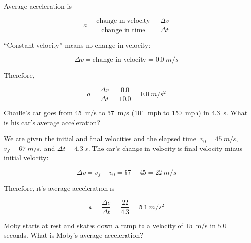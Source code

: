 \documentclass{article}
\numberwithin{equation}{section}
\numberwithin{figure}{section}
\begin{document}
\Solution Average acceleration is

\begin{equation*}
    a = \frac{\text{change in velocity}}{\text{change in time}} = 
    \frac{\Delta{v}}{\Delta{t}}
\end{equation*}

``Constant velocity'' means no change in velocity: 

\begin{equation*}
    \Delta{v} = \text{change in velocity} = \SI{0.0}{m/s}
\end{equation*}

Therefore,

\begin{equation*}
    a = \frac{\Delta{v}}{\Delta{t}} = \frac{0.0}{10.0} = \SI{0.0}{m/s^2}
\end{equation*}

\begin{example}
   Charlie's car goes from \SI{45}{m/s} to \SI{67}{m/s} (\SI{101}{mph} to \SI{150}{mph}) in \SI{4.3}{s}. What is his car's average acceleration? 
\end{example}

\Solution We are given the initial and final velocities and the elapsed time: $v_0 = \SI{45}{m/s}$, $v_f = \SI{67}{m/s}$, and $\Delta{t} = \SI{4.3}{s}$. The car's change in velocity is final velocity minus initial velocity:

\begin{equation*}
    \Delta{v} = v_f - v_0 = 67 - 45 = \SI{22}{m/s}
\end{equation*}

Therefore, it's average acceleration is


 \begin{equation*}
    a = \frac{\Delta{v}}{\Delta{t}} = \frac{22}{4.3} = \SI{5.1}{m/s^2}
\end{equation*}

\begin{exercise} \label{kVZPeG}
  Moby starts at rest and skates down a ramp to a velocity of \SI{15}{m/s} in 5.0 seconds. What is Moby's average acceleration? 
\end{exercise}



\end{document}

